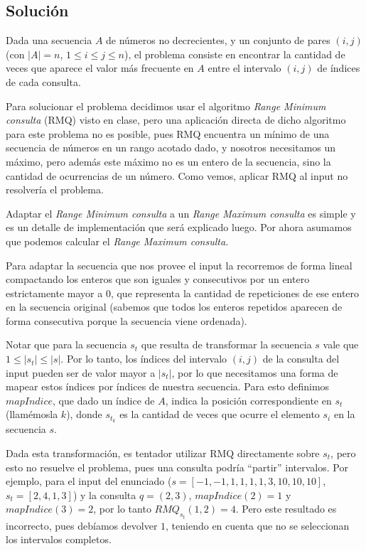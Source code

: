 \subsection*{Solución}

Dada una secuencia $A$ de números no decrecientes, y un conjunto de pares $(i,j)$
(con $|A|=n$, $1 \le i \le j \le n$), el problema consiste en encontrar la
cantidad de veces que aparece el valor más frecuente en $A$ entre el intervalo
$(i,j)$ de índices de cada consulta.

Para solucionar el problema decidimos usar el algoritmo {\sl Range Minimum consulta}
(RMQ) visto en clase, pero una aplicación directa de dicho algoritmo para este problema
no es posible, pues RMQ encuentra un mínimo de una secuencia de números en un rango
acotado dado, y nosotros necesitamos un máximo, pero además este máximo no es
un entero de la secuencia, sino la cantidad de ocurrencias de un número.
Como vemos, aplicar RMQ al input no resolvería el problema.

Adaptar el {\sl Range Minimum consulta} a un {\sl Range Maximum consulta} es simple
y es un detalle de implementación que será explicado luego. Por ahora asumamos
que podemos calcular el {\sl Range Maximum consulta}.

Para adaptar la secuencia que nos provee el input la recorremos de forma
lineal compactando los enteros que son iguales y consecutivos por un entero
estrictamente mayor a $0$, que representa la cantidad de repeticiones de ese
entero en la secuencia original (sabemos que todos los enteros repetidos
aparecen de forma consecutiva porque la secuencia viene ordenada).

Notar que para la secuencia $s_t$ que resulta de transformar la secuencia $s$ vale
que $1 \le |s_t| \le |s|$. Por lo tanto, los índices del intervalo $(i,j)$
de la consulta del input pueden ser de valor mayor a $|s_t|$, por lo que necesitamos
una forma de mapear estos índices por índices de nuestra secuencia. Para esto
definimos $mapIndice$, que dado un índice de $A$, indica la posición correspondiente
en $s_t$ (llamémosla $k$), donde $s_{t_k}$ es la cantidad de veces que ocurre el
elemento $s_i$ en la secuencia $s$.

Dada esta transformación, es tentador utilizar RMQ directamente sobre $s_t$, pero
esto no resuelve el problema, pues una consulta podría ``partir'' intervalos.
Por ejemplo, para el input del enunciado
($s = [-1, -1, 1, 1, 1, 1, 3, 10, 10, 10]$, $s_t = [2, 4, 1, 3]$) y la consulta
$q=(2,3)$, $mapIndice(2) = 1$ y $mapIndice(3) = 2$, por lo tanto $RMQ_{s_t}(1,2)
=4$. Pero este resultado es incorrecto, pues debíamos devolver $1$, teniendo en
cuenta que no se seleccionan los intervalos completos.

